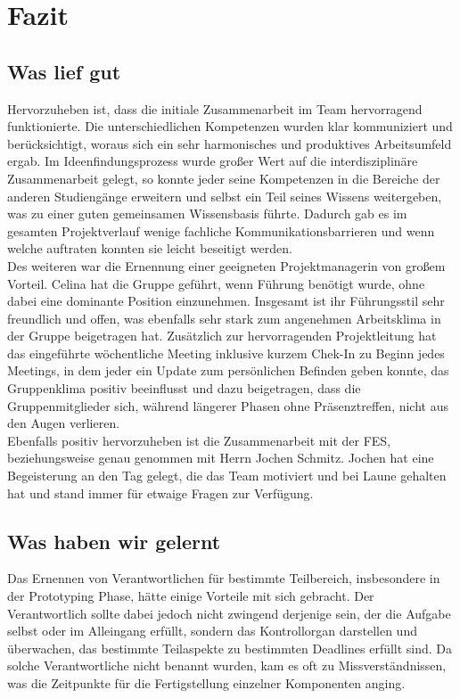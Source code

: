 \chapter{Fazit}

\section{Was lief gut}
    Hervorzuheben ist, dass die initiale Zusammenarbeit im Team hervorragend funktionierte. Die unterschiedlichen Kompetenzen wurden klar kommuniziert und berücksichtigt, woraus sich ein sehr harmonisches und produktives Arbeitsumfeld ergab. Im Ideenfindungsprozess wurde großer Wert auf die interdisziplinäre Zusammenarbeit gelegt, so konnte jeder seine Kompetenzen in die Bereiche der anderen Studiengänge erweitern und selbst ein Teil seines Wissens weitergeben, was zu einer guten gemeinsamen Wissensbasis führte. Dadurch gab es im gesamten Projektverlauf wenige fachliche Kommunikationsbarrieren und wenn welche auftraten konnten sie leicht beseitigt werden.\\

    Des weiteren war die Ernennung einer geeigneten Projektmanagerin von großem Vorteil. Celina hat die Gruppe geführt, wenn Führung benötigt wurde, ohne dabei eine dominante Position einzunehmen. Insgesamt ist ihr Führungsstil sehr freundlich und offen, was ebenfalls sehr stark zum angenehmen Arbeitsklima in der Gruppe beigetragen hat. Zusätzlich zur hervorragenden Projektleitung hat das eingeführte wöchentliche Meeting inklusive kurzem Chek-In zu Beginn jedes Meetings, in dem jeder ein Update zum persönlichen Befinden geben konnte, das Gruppenklima positiv beeinflusst und dazu beigetragen, dass die Gruppenmitglieder sich, während längerer Phasen ohne Präsenztreffen, nicht aus den Augen verlieren. \\

    Ebenfalls positiv hervorzuheben ist die Zusammenarbeit mit der FES, beziehungsweise genau genommen mit Herrn Jochen Schmitz. Jochen hat eine Begeisterung an den Tag gelegt, die das Team motiviert und bei Laune gehalten hat und stand immer für etwaige Fragen zur Verfügung.\\

\section{Was haben wir gelernt}
    Das Ernennen von Verantwortlichen für bestimmte Teilbereich, insbesondere in der Prototyping Phase, hätte einige Vorteile mit sich gebracht. Der Verantwortlich sollte dabei jedoch nicht zwingend derjenige sein, der die Aufgabe selbst oder im Alleingang erfüllt, sondern das Kontrollorgan darstellen und überwachen, das bestimmte Teilaspekte zu bestimmten Deadlines erfüllt sind. Da solche Verantwortliche nicht benannt wurden, kam es oft zu Missverständnissen, was die Zeitpunkte für die Fertigstellung einzelner Komponenten anging.\\

